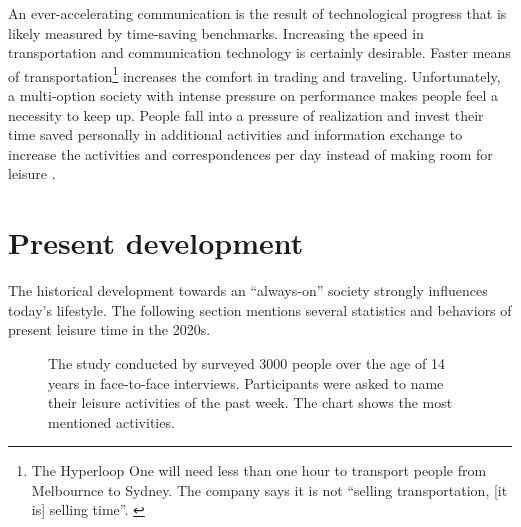 \documentclass[12pt,numbers=noenddot,parskip,bibliography=totocnumbered,listof=totocnumbered,draft]{scrreprt}
\begin{document}
An ever-accelerating communication is the result of technological progress that is likely measured by time-saving benchmarks. Increasing the speed in transportation and communication technology is certainly desirable. Faster means of transportation\footnote{The Hyperloop One will need less than one hour to transport people from Melbournce to Sydney. The company says it is not ``selling transportation, [it is] selling time''. \cite{hyperloop2017}} increases the comfort in trading and traveling. Unfortunately, a multi-option society with intense pressure on performance makes people feel a necessity to keep up. People fall into a pressure of realization and invest their time saved personally in additional activities and information exchange to increase the activities and correspondences per day instead of making room for leisure \citep[p.27-30]{gross1994}.

\section{Present development}
The historical development towards an ``always-on'' society strongly influences today's lifestyle. The following section mentions several statistics and behaviors of present leisure time in the 2020s.

\begin{figure}
\centering
{}
\caption[Most mentioned activities]{The study conducted by \citeauthor{freizeitmonitor2016} surveyed 3000 people over the age of 14 years in face-to-face interviews. Participants were asked to name their leisure activities of the past week. The chart shows the most mentioned activities.}
\label{topleisureactivities}
\end{figure}
\end{document}
